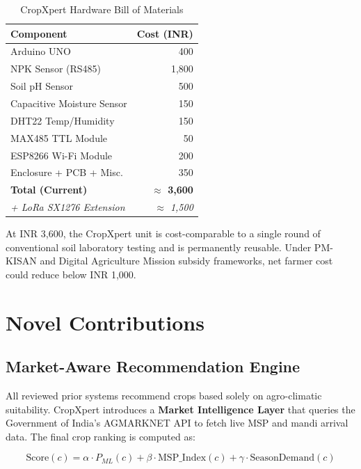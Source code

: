 \documentclass[10pt,twocolumn]{article}
\begin{document}
\begin{table}[htbp]
\caption{CropXpert Hardware Bill of Materials}
\centering\small
\begin{tabular}{lr}
\toprule
\textbf{Component} & \textbf{Cost (INR)} \\
\midrule
Arduino UNO              & 400   \\
NPK Sensor (RS485)       & 1,800 \\
Soil pH Sensor           & 500   \\
Capacitive Moisture Sensor & 150  \\
DHT22 Temp/Humidity      & 150   \\
MAX485 TTL Module        & 50    \\
ESP8266 Wi-Fi Module     & 200   \\
Enclosure + PCB + Misc.  & 350   \\
\midrule
\textbf{Total (Current)} & \textbf{$\approx$ 3,600} \\
\textit{+ LoRa SX1276 Extension} & \textit{$\approx$ 1,500} \\
\bottomrule
\end{tabular}
\label{tab:bom}
\end{table}

At INR 3,600, the CropXpert unit is cost-comparable to a single round of conventional soil laboratory testing and is permanently reusable. Under PM-KISAN and Digital Agriculture Mission subsidy frameworks, net farmer cost could reduce below INR 1,000.

\section{Novel Contributions}

\subsection{Market-Aware Recommendation Engine}

All reviewed prior systems recommend crops based solely on agro-climatic suitability. CropXpert introduces a \textbf{Market Intelligence Layer} that queries the Government of India's AGMARKNET API to fetch live MSP and mandi arrival data. The final crop ranking is computed as:

\begin{equation}
\text{Score}(c) = \alpha \cdot P_{ML}(c) + \beta \cdot \text{MSP\_Index}(c) + \gamma \cdot \text{SeasonDemand}(c)
\end{equation}
\end{document}
